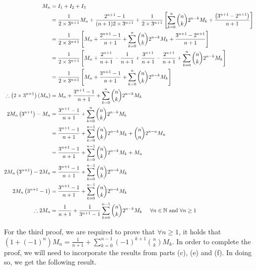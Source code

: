 \documentclass[a4paper]{article}
\begin{document}
\begin{enumerate}[label=\textbf{\arabic*.}]
\begin{enumerate}
		\begin{align*}
		M_n & = I_1 + I_2 + I_3\\
		& = \frac{1}{2\times3^{n+1}}M_n + \frac{2^{n+1}-1}{(n+1)2\times3^{n+1}} + \frac{1}{2\times3^{n+1}}\left[\sum_{k=0}^{n}\binom{n}{k}2^{n-k}M_k + \frac{\left(3^{n+1} - 2^{n+1}\right)}{n+1}\right]\\
		& = \frac{1}{2\times3^{n+1}}\left[M_n + \frac{2^{n+1}-1}{n+1} + \sum_{k=0}^{n}\binom{n}{k}2^{n-k}M_k + \frac{3^{n+1} - 2^{n+1}}{n+1}\right]\\
		& = \frac{1}{2\times3^{n+1}}\left[M_n + \frac{2^{n+1}}{n+1} - \frac{1}{n+1}+ \frac{3^{n+1}}{n+1} - \frac{2^{n+1}}{n+1} + \sum_{k=0}^{n}\binom{n}{k}2^{n-k}M_k\right]\\
		& = \frac{1}{2\times3^{n+1}}\left[M_n + \frac{3^{n+1}-1}{n+1} + \sum_{k=0}^{n}\binom{n}{k}2^{n-k}M_k\right]\\
		\therefore \left(2\times3^{n+1}\right)\left(M_n\right) & = M_n + \frac{3^{n+1}-1}{n+1} + \sum_{k=0}^{n}\binom{n}{k}2^{n-k}M_k\\
		2M_n\left(3^{n+1}\right) - M_n & = \frac{3^{n+1}-1}{n+1} + \sum_{k=0}^{n}\binom{n}{k}2^{n-k}M_k\\
		& = \frac{3^{n+1}-1}{n+1} + \sum_{k=0}^{n-1}\binom{n}{k}2^{n-k}M_k + \binom{n}{n}2^{n-n}M_n\\
		& = \frac{3^{n+1}-1}{n+1} + \sum_{k=0}^{n-1}\binom{n}{k}2^{n-k}M_k + M_n\\
		2M_n\left(3^{n+1}\right) - 2M_n & = \frac{3^{n+1}-1}{n+1} + \sum_{k=0}^{n-1}\binom{n}{k}2^{n-k}M_k\\
		2M_n\left(3^{n+1} - 1\right) & = \frac{3^{n+1}-1}{n+1} + \sum_{k=0}^{n-1}\binom{n}{k}2^{n-k}M_k\\
		\therefore 2M_n & = \frac{1}{n+1} + \frac{1}{3^{n+1}-1}\sum_{k=0}^{n-1}\binom{n}{k}2^{n-k}M_k \hspace{5mm} \forall n \in \mathbb{N} \text{ and } \forall n \geq 1\\
		\end{align*}

		\pagebreak

		For the third proof, we are required to prove that $\forall n \geq 1$, it holds that \linebreak $\displaystyle{\left(1+\left(-1\right)^{n}\right)M_n} = \displaystyle{\frac{1}{n+1} + \sum_{k=0}^{n-1}\left(-1\right)^{k+1}\binom{n}{k}M_k}$. In order to complete the proof, we will need to incorporate the results from parts (c), (e) and (f). In doing so, we get the following result.


\end{enumerate}
\end{enumerate}
\end{document}
